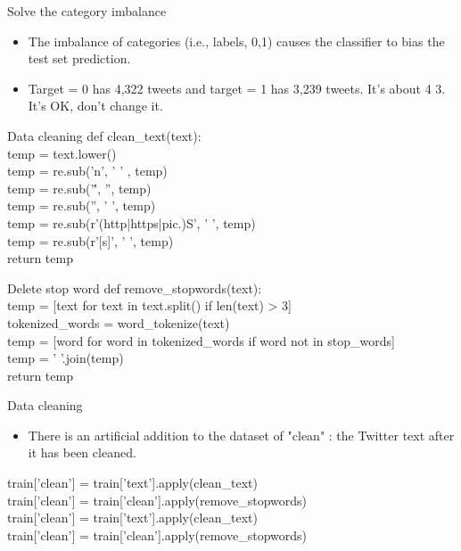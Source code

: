 \documentclass[
 size=14pt,
 paper=smartboard,  %
 mode=present, 		%
 display=slides, 	%
 style=tuliplab,  	%
 pauseslide,
 fleqn,leqno]{powerdot}
\begin{document}
\begin{slide}{Solve the category imbalance}
\begin{itemize}
	\item  The imbalance of categories (i.e., labels, 0,1) causes the classifier to bias the test set prediction. \\
\item Target = 0 has 4,322 tweets and target = 1 has 3,239 tweets. It's about 4 3. It's OK, don't change it.\\
\end{itemize}
\end{slide}

\begin{slide}{Data cleaning}
	def clean\_text(text):\\
	temp = text.lower()          \\                       
	temp = re.sub('n', ' ' , temp)   \\                  
	temp = re.sub('\'', '', temp)     \\                  
	temp = re.sub('', ' ', temp)    \\                   
	temp = re.sub(r'(http|https|pic.)S', ' ', temp)    \\
	temp = re.sub(r'[s]', ' ', temp)       \\         
	return temp
\end{slide}
\begin{slide}{Delete stop word}
def remove\_stopwords(text):\\
	temp = [text for text in text.split() if len(text) > 3]\\
	tokenized\_words = word\_tokenize(text)\\
	temp = [word for word in tokenized\_words if word not in stop\_words]\\
	temp = ' '.join(temp)\\
	return temp\\
\end{slide}
\begin{slide}{Data cleaning}
\begin{itemize}
	\item There is an artificial addition to the dataset of "clean" : the Twitter text after it has been cleaned.\\
\end{itemize}
train['clean'] = train['text'].apply(clean\_text)\\
train['clean'] = train['clean'].apply(remove\_stopwords)\\
train['clean'] = train['text'].apply(clean\_text)\\
train['clean'] = train['clean'].apply(remove\_stopwords)\\
\end{slide}
\end{document}
